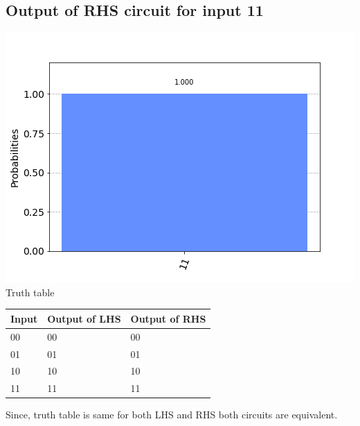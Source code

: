 \documentclass[a4paper]{article}
\begin{document}
\begin{answer}[Question 1 b (b)]
        \subsection*{Output of RHS circuit for input 11}
        \includegraphics[scale = 0.5]{b211-out.png}
        Truth table        
        \begin{center}
            \begin{tabular}{ | m{3cm}| m{3cm} |m{3cm}| } 
                \hline
                Input	&	Output of LHS & Output of RHS \\
                \hline
                00 & 00&00\\
                01 & 01&01\\
                10 & 10&10\\
                11 & 11&11\\
                \hline
            \end{tabular}
        \end{center} 
        Since, truth table is same for both LHS and RHS both circuits are equivalent. 
    \end{answer}
\end{document}
